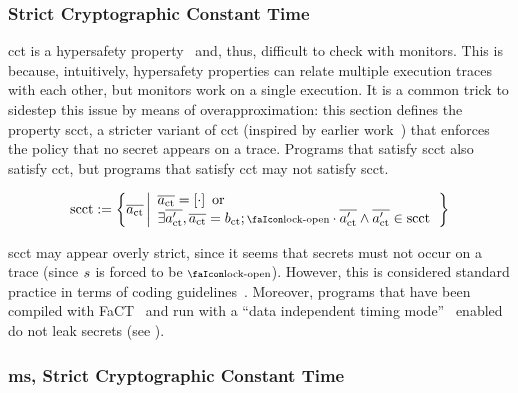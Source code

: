 \subsubsection{Strict Cryptographic Constant Time}

\gls*{cct} is a hypersafety property~\cite{barthe2018sec} and, thus, difficult to check with monitors.
This is because, intuitively, hypersafety properties can relate multiple execution traces with each other, but monitors work on a single execution.
It is a common trick to sidestep this issue by means of overapproximation: this section defines the property \gls*{scct}, a stricter variant of \gls*{cct} (inspired by earlier work~\cite{almeida2017jasmin}) that enforces the policy that no secret appears on a trace.
Programs that satisfy \gls*{scct} also satisfy \gls*{cct}, but programs that satisfy \gls*{cct} may not satisfy \gls*{scct}.

\begin{definition}\label{def:trace:scctdef}
  
  \noindent\[
  \scctsafe:=\left\{\trace[_{\ctsafe}] \left|\begin{array}{l}
      \trace[_{\ctsafe}]=\hole{\cdot} \text{ or } \\\exists\trace[_{\ctsafe}'],\trace[_{\ctsafe}]=\preevent[_{\ctsafe}];\unlock\cdot\trace[_{\ctsafe}'] \wedge \trace[_{\ctsafe}']\in\scctsafe
    \end{array}\right.\right\}
  \]
\end{definition}

\gls*{scct} may appear overly strict, since it seems that secrets must not occur on a trace (since $s{}$ is forced to be $\unlock$). 
However, this is considered standard practice in terms of coding guidelines~\cite{ctguidelines}.
Moreover, programs that have been compiled with FaCT~\cite{cauligi2019fact} and run with a ``data independent timing mode''~\cite{arm-refman,intel-refman} enabled do not leak secrets (see ). 

\subsubsection{\gls*{ms}, Strict Cryptographic Constant Time}\label{sec:msscct-rel}

